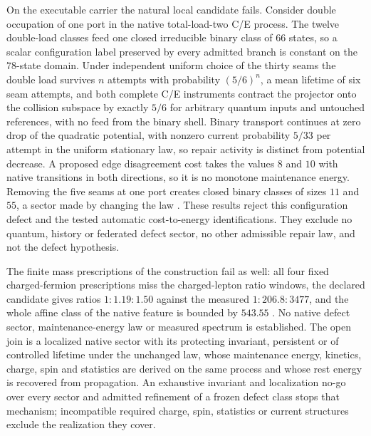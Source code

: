 \documentclass[11pt]{article}
\theoremstyle{definition}
\theoremstyle{remark}
\begin{document}
On the executable carrier the natural local candidate fails. Consider double
occupation of one port in the native total-load-two C/E process. The twelve
double-load classes feed one closed irreducible binary class of $66$ states,
so a scalar configuration label preserved by every admitted branch is
constant on the $78$-state domain. Under independent uniform choice of the
thirty seams the double load survives $n$ attempts with probability
$(5/6)^n$, a mean lifetime of six seam attempts, and both complete C/E
instruments contract the projector onto the collision subspace by exactly
$5/6$ for arbitrary quantum inputs and untouched references, with no feed
from the binary shell. Binary transport continues at zero drop of the
quadratic potential, with nonzero current probability $5/33$ per attempt in
the uniform stationary law, so repair activity is distinct from potential
decrease. A proposed edge disagreement cost takes the values $8$ and $10$
with native transitions in both directions, so it is no monotone maintenance
energy. Removing the five seams at one port creates closed binary classes of
sizes $11$ and $55$, a sector made by changing the law \cite{ophmodel}.
These results reject this configuration defect and the tested automatic
cost-to-energy identifications. They exclude no quantum, history or
federated defect sector, no other admissible repair law, and not the defect
hypothesis.

The finite mass prescriptions of the construction fail as well: all four
fixed charged-fermion prescriptions miss the charged-lepton ratio windows,
the declared candidate gives ratios $1:1.19:1.50$ against the measured
$1:206.8:3477$, and the whole affine class of the native feature is bounded
by $543.55$ \cite{ophmodel}. No native defect sector, maintenance-energy law
or measured spectrum is established. The open join is a localized native
sector with its protecting invariant, persistent or of controlled lifetime
under the unchanged law, whose maintenance energy, kinetics, charge, spin
and statistics are derived on the same process and whose rest energy is
recovered from propagation. An exhaustive invariant and localization no-go
over every sector and admitted refinement of a frozen defect class stops
that mechanism; incompatible required charge, spin, statistics or current
structures exclude the realization they cover.



\end{document}
